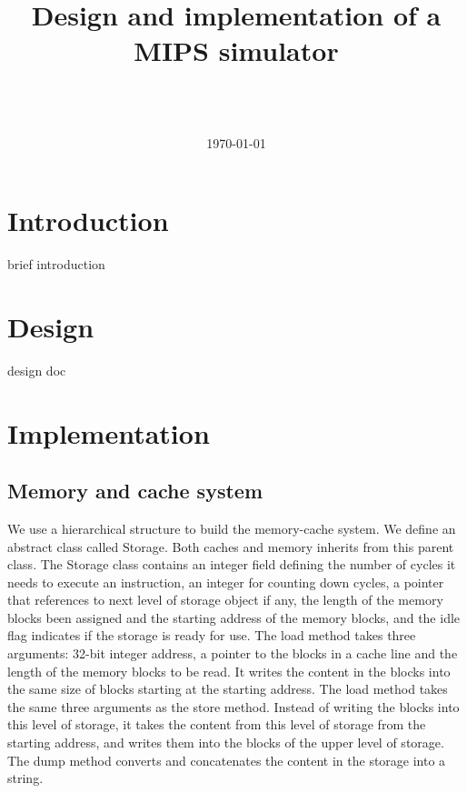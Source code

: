 \documentclass{sig-alternate}
\begin{document}
\title{Design and implementation of a MIPS simulator}
\author{
\and
{} \\  \\
}

\date{\today}
\maketitle
\section{Introduction}

brief introduction 

\section{Design}

design doc

\section{Implementation}
\subsection{Memory and cache system}
We use a hierarchical structure to build the memory-cache system. We define an abstract class called Storage. Both caches and memory inherits from this parent class. The Storage class contains an integer field defining the number of cycles it needs to execute an instruction, an integer for counting down cycles, a pointer that references to next level of storage object if any, the length of the memory blocks been assigned and the starting address of the memory blocks, and the idle flag indicates if the storage is ready for use. The load method takes three arguments: 32-bit integer address, a pointer to the  blocks in a cache line and the length of the memory blocks to be read. It writes the content in the blocks into the same size of blocks starting at the starting address. The load method takes the same three arguments as the store method. Instead of writing the blocks into this level of storage, it takes the content from this level of storage from the starting address, and writes them into the blocks of the upper level of storage. The dump method converts and concatenates the content in the storage into a string. 
\end{document}
